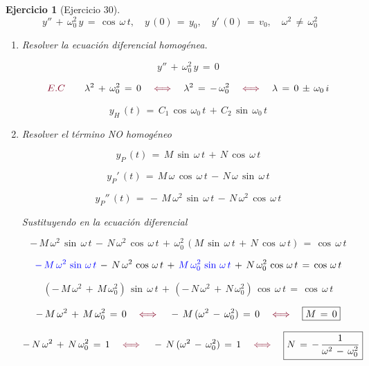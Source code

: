 \documentclass[a4paper,11pt, openany]{book}
\newtheorem{ejer}{Ejercicio}[section]
\newcommand*{\itembolasazules}[1]{%
\footnotesize\protect\tikz[baseline=-3pt]%
\protect\node[scale=.7, circle, shade, ball
color=green]{\color{white}\Large\bf#1};}
\begin{document}
\begin{ejer}[Ejercicio 30]

$$y''\,+\,\omega_{0}^{2}\,y\,=\,\cos\,\omega\,t, \quad y\,(0)\,=\,y_{0}, \quad y'\,(0)\,=\,v_{0}, \quad \omega^{2}\,\neq\,\omega_{0}^{2}$$
 
\begin{enumerate}[label=\itembolasazules{\arabic*}]
 
 
\item  Resolver la ecuación diferencial homogénea.
 
$$y''\,+\,\omega_{0}^{2}\,y\,=\,0$$
 
$$\textcolor{burgundy}{E.C} \qquad \lambda^{2}\,+\,\omega_{0}^{2}\,=\,0 \quad \textcolor{burgundy}{\iff} \quad \lambda^{2}\,=\,-\,\omega_{0}^{2} \quad \textcolor{burgundy}{\iff} \quad \lambda\,=\,0\,\pm\,\omega_{0}\,i$$
 
$$\boxed{y_{H}\,(t)\,=\,C_{1}\,\cos\,\omega_{0}\,t\,+\,C_{2}\,\sin\,\omega_{0}\,t}$$
 
\item Resolver el término NO homogéneo 
 
$$y_{P}\,(t)\,=\,M\,\sin\,\omega\,t\,+\,N\,\cos\,\omega\,t$$
 
$$y_{P}'\,(t)\,=\,M\,\omega\,\cos\,\omega\,t\,-\,N\,\omega\,\sin\,\omega\,t$$
 
$$y_{P}''\,(t)\,=\,-\,M\,\omega^{2}\,\sin\,\omega\,t\,-\,N\,\omega^{2}\,\cos\,\omega\,t$$
 
Sustituyendo en la ecuación diferencial
 
$$-\,M\,\omega^{2}\,\sin\,\omega\,t\,-\,N\,\omega^{2}\,\cos\,\omega\,t\,+\,\omega_{0}^{2}\,\left(M\,\sin\,\omega\,t\,+\,N\,\cos\,\omega\,t \right)\,=\,\cos\,\omega\,t$$
 
$$\textcolor{blue}{-\,M\,\omega^{2}\,\sin\,\omega\,t}\,-\,N\,\omega^{2}\,\cos\,\omega\,t\,+\,\textcolor{blue}{M\,\omega_{0}^{2}\,\sin\,\omega\,t}\,+\,N\,\omega_{0}^{2}\,\cos\,\omega\,t\,=\,\cos\,\omega\,t$$
 
$$(-\,M\,\omega^{2}\,+\,M\,\omega_{0}^{2})\,\sin\,\omega\,t\,+\,(-\,N\,\omega^{2}\,+\,N\,\omega_{0}^{2})\,\cos\,\omega\,t\,=\,\cos\,\omega\,t$$
 
$$-\,M\,\omega^{2}\,+\,M\,\omega_{0}^{2}\,=\,0 \quad \textcolor{burgundy}{\iff} \quad -\,M\,(\omega^{2}\,-\,\omega_{0}^{2})\,=\,0 \quad \textcolor{burgundy}{\iff} \quad \boxed{M\,=\,0}$$
 
$$-\,N\,\omega^{2}\,+\,N\,\omega_{0}^{2}\,=\,1 \quad \textcolor{burgundy}{\iff} \quad -\,N\,(\omega^{2}\,-\,\omega_{0}^{2})\,=\,1 \quad \textcolor{burgundy}{\iff} \quad \boxed{N\,=\,-\,\dfrac{1}{\omega^{2}\,-\,\omega_{0}^{2}} }$$
 

\end{enumerate}
\end{ejer}
\end{document}
